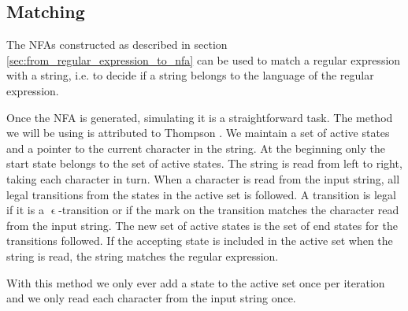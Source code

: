 \subsection{Matching}

The NFAs constructed as described in section
\vref{sec:from_regular_expression_to_nfa} can be used to match a
regular expression with a string, i.e. to decide if a string belongs
to the language of the regular expression. 


Once the NFA is generated, simulating it is a straightforward
task. The method we will be using is attributed to Thompson
\cite{Thompson1968}. We maintain a set of active states and a pointer
to the current character in the string. At the beginning only the
start state belongs to the set of active states. The string is read
from left to right, taking each character in turn. When a character is
read from the input string, all legal transitions from the states in
the active set is followed. A transition is legal if it is a
$\upvarepsilon$-transition or if the mark on the transition matches
the character read from the input string. The new set of active states
is the set of end states for the transitions followed. If the
accepting state is included in the active set when the string is read,
the string matches the regular expression.

With this method we only ever add a state to the active set once per
iteration and we only read each character from the input string once.


